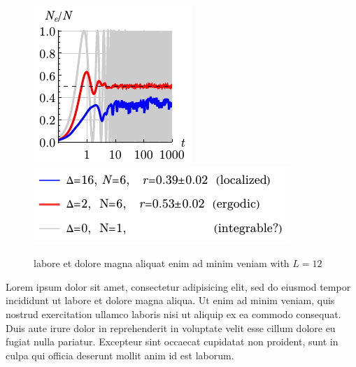 \begin{figure}[h]
    \centering
    \hspace{10 mm} 
    \includegraphics[align=c]{imgs/lo2.pdf}
    \hspace{1 mm} 
    \includegraphics[align=c]{imgs/lo2l.pdf}
    \caption{labore et dolore magna aliquat enim ad minim veniam with $L=12$}
\end{figure}

Lorem ipsum dolor sit amet, consectetur adipisicing elit, sed do eiusmod
tempor incididunt ut labore et dolore magna aliqua. Ut enim ad minim veniam,
quis nostrud exercitation ullamco laboris nisi ut aliquip ex ea commodo
consequat. Duis aute irure dolor in reprehenderit in voluptate velit esse
cillum dolore eu fugiat nulla pariatur. Excepteur sint occaecat cupidatat non
proident, sunt in culpa qui officia deserunt mollit anim id est laborum.



